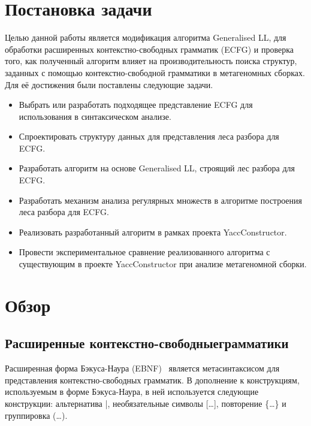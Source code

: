 \documentclass[14pt]{matmex-diploma-custom}
\begin{document}
	\section{Постановка задачи}
	
	Целью данной работы является модификация алгоритма Generalised LL, для обработки
	расширенных контекстно-свободных грамматик (ECFG) и проверка того, как полученный 
	алгоритм влияет на производительность поиска структур, заданных с помощью 
	контекстно-свободной грамматики в метагеномных сборках. Для её достижения были 
	поставлены следующие задачи.
	
	\begin{itemize}  
		\item Выбрать или разработать подходящее представление ECFG для использования в синтаксическом анализе.
		\item Спроектировать структуру данных для представления леса разбора для ECFG.
		\item Разработать алгоритм на основе Generalised LL, строящий лес разбора для ECFG.
        \item Разработать механизм анализа регулярных множеств в алгоритме построения леса разбора для ECFG.
		\item Реализовать разработанный алгоритм в рамках проекта YaccConstructor.
		\item Провести экспериментальное сравнение реализованного алгоритма с существующим в проекте YaccConstructor при анализе метагеномной сборки.
	\end{itemize}
	
	\section{Обзор}
	
	\subsection{Расширенные контекстно-свободные\newline грамматики}
	
	Расширенная форма Бэкуса-Наура (EBNF)~\cite{EBNFISO} является метасинтаксисом для представления 
	контекстно-свободных грамматик. В дополнение к конструкциям, используемым в форме
	Бэкуса-Наура, в ней используется следующие конструкции: альтернатива |,
	необязательные символы [\dots], повторение \{\dots\} и группировка (\dots).
	
\end{document}
